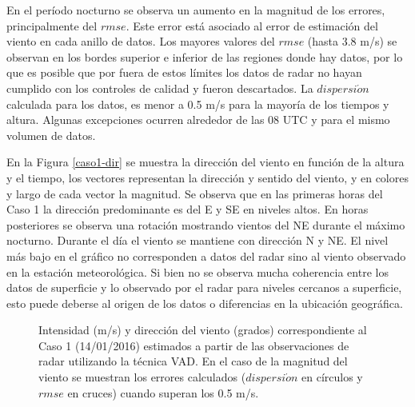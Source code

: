 \documentclass[12pt,spanish,oneside, a4paper]{book}
\begin{document}
En el período nocturno se observa un aumento en la magnitud de los
errores, principalmente del \(rmse\). Este error está asociado al error
de estimación del viento en cada anillo de datos. Los mayores valores
del \(rmse\) (hasta 3.8 m/s) se observan en los bordes superior e
inferior de las regiones donde hay datos, por lo que es posible que por
fuera de estos límites los datos de radar no hayan cumplido con los
controles de calidad y fueron descartados. La \(dispersi\acute{o}n\)
calculada para los datos, es menor a 0.5 m/s para la mayoría de los
tiempos y altura. Algunas excepciones ocurren alrededor de las 08 UTC y
para el mismo volumen de datos.

En la Figura \ref{caso1-dir} se muestra la dirección del viento en
función de la altura y el tiempo, los vectores representan la dirección
y sentido del viento, y en colores y largo de cada vector la magnitud.
Se observa que en las primeras horas del Caso 1 la dirección
predominante es del E y SE en niveles altos. En horas posteriores se
observa una rotación mostrando vientos del NE durante el máximo
nocturno. Durante el día el viento se mantiene con dirección N y NE. El
nivel más bajo en el gráfico no corresponden a datos del radar sino al
viento observado en la estación meteorológica. Si bien no se observa
mucha coherencia entre los datos de superficie y lo observado por el
radar para niveles cercanos a superficie, esto puede deberse al origen
de los datos o diferencias en la ubicación geográfica.

\begin{figure}
\newline{}\caption{Intensidad (m/s) y dirección del viento (grados) correspondiente al Caso 1 (14/01/2016) estimados a partir de las observaciones de radar utilizando la técnica VAD. En el caso de la magnitud del viento se muestran los errores calculados ($dispersi\acute{o}n$ en círculos y $rmse$ en cruces) cuando superan los 0.5 m/s. \label{campo-caso1}}\label{fig:campo-caso1}
\end{figure}
\end{document}
